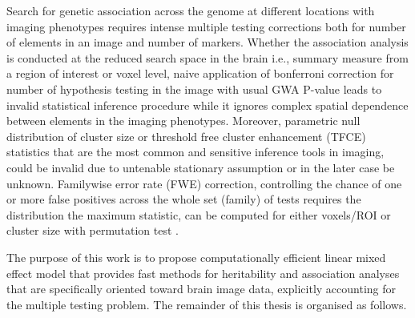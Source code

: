 Search for genetic association across the genome at different locations with imaging phenotypes requires intense multiple testing corrections both for number of elements in an image and number of markers.  Whether the association analysis is conducted at the reduced search space in the brain   i.e., summary measure from a region of interest or voxel level, naive application of bonferroni correction for number of hypothesis testing in the image with usual GWA P-value leads to invalid statistical inference procedure while it ignores complex spatial dependence between elements in the imaging phenotypes.   Moreover, parametric null distribution of cluster size \citep{Friston1994} or threshold free cluster enhancement (TFCE) statistics \citep{Smith2009} that are the most common and sensitive inference tools in imaging,  could be invalid due to untenable stationary assumption or in the later case be unknown. Familywise error rate (FWE) correction, controlling the chance of one or more false positives  across the whole set (family) of tests \citep{Nichols2003} requires the distribution the maximum statistic, can be  computed for either voxels/ROI or cluster size with permutation test \citep{Nichols2002}.


The purpose of this work is to propose computationally efficient linear mixed effect model that provides fast methods for heritability and association analyses that are specifically oriented toward brain image data, explicitly accounting for the multiple testing problem. The remainder of this thesis is organised as follows.

